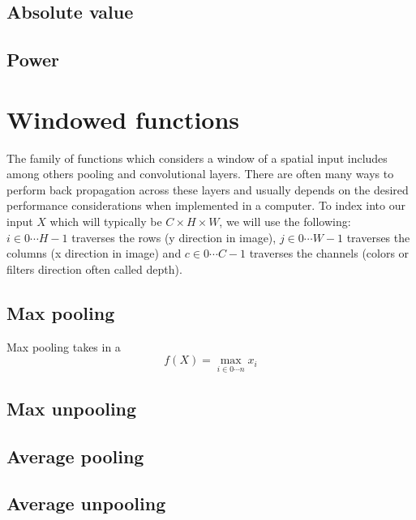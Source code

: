 \documentclass[a4paper]{article}
\begin{document}
\subsection{Absolute value}
\subsection{Power}


\newpage
\section{Windowed functions}
The family of functions which considers a window of a spatial input includes among others pooling and convolutional layers. There are often many ways to perform back propagation across these layers and usually depends on the desired performance considerations when implemented in a computer.  To index into our input $X$ which will typically be $C \times H \times W$, we will use the following: $i \in 0 \cdots H-1$ traverses the rows (y direction in image), $j \in 0 \cdots W-1$ traverses the columns (x direction in image) and $c \in 0 \cdots C-1$ traverses the channels (colors or filters direction often called depth).

\subsection{Max pooling}
Max pooling takes in a 
\begin{equation}
f(X)=\max\limits_{i \in 0 \cdots n} x_i
\end{equation}
\subsection{Max unpooling}
\subsection{Average pooling}
\subsection{Average unpooling}
\end{document}
